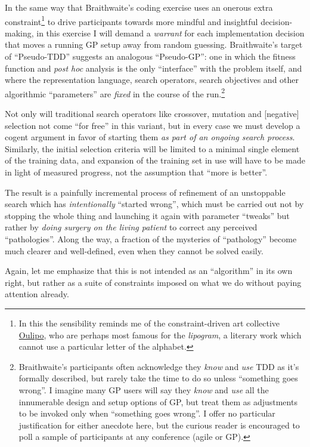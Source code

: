 In the same way that Braithwaite's coding exercise uses an onerous extra constraint\footnote{In this the sensibility reminds me of the constraint-driven art collective \href{http://en.wikipedia.org/wiki/Oulipo}{Oulipo}, who are perhaps most famous for the \emph{lipogram}, a literary work which cannot use a particular letter of the alphabet.} to drive participants towards more mindful and insightful decision-making, in this exercise I will demand a \emph{warrant} for each implementation decision that moves a running GP setup away from random guessing. Braithwaite's target of ``Pseudo-TDD'' suggests an analogous ``Pseudo-GP'': one in which the fitness function and \emph{post hoc} analysis is the only ``interface'' with the problem itself, and where the representation language, search operators, search objectives and other algorithmic ``parameters'' are \emph{fixed} in the course of the run.\footnote{Braithwaite's participants often acknowledge they \emph{know} and \emph{use} TDD as it's formally described, but rarely take the time to do so unless ``something goes wrong''. I imagine many GP users will say they \emph{know} and \emph{use} all the innumerable design and setup options of GP, but treat them as adjustments to be invoked only when ``something goes wrong''. I offer no particular justification for either anecdote here, but the curious reader is encouraged to poll a sample of participants at any conference (agile or GP).}

Not only will traditional search operators like crossover, mutation and [negative] selection not come ``for free'' in this variant, but in every case we must develop a cogent argument in favor of starting them \emph{as part of an ongoing search process}. Similarly, the initial selection criteria will be limited to a minimal single element of the training data, and expansion of the training set in use will have to be made in light of measured progress, not the assumption that ``more is better''.

The result is a painfully incremental process of refinement of an unstoppable search which has \emph{intentionally} ``started wrong'', which must be carried out not by stopping the whole thing and launching it again with parameter ``tweaks'' but rather by \emph{doing surgery on the living patient} to correct any perceived ``pathologies''. Along the way, a fraction of the mysteries of ``pathology'' become much clearer and well-defined, even when they cannot be solved easily.

Again, let me emphasize that this is not intended as an ``algorithm'' in its own right, but rather as a suite of constraints imposed on what we do without paying attention already.

